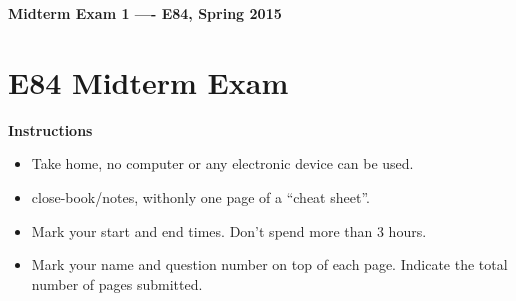 \documentclass[12pt]{article}
\begin{document}
\begin{center}
{\Large \bf  Midterm Exam 1 ---- E84, Spring 2015}
\end{center}

\section*{E84 Midterm Exam}

{\bf Instructions}
\begin{itemize}
\item Take home, no computer or any electronic device can be used.
\item close-book/notes, withonly one page of a ``cheat sheet''.
\item Mark your start and end times. Don't spend more than 3 hours.
\item Mark your name and question number on top of each page.
	Indicate the total number of pages submitted.
\end{itemize}
\end{document}

